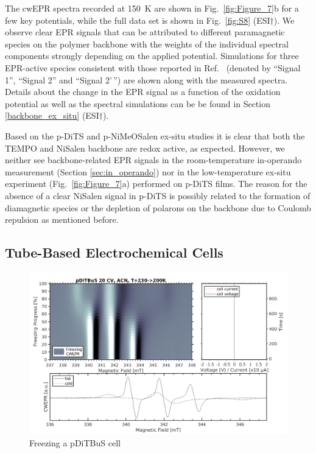The cwEPR spectra recorded at 150~K are shown in Fig.~\ref{fig:Figure_7}b for a few key potentials, while the full data set is shown in Fig.~\ref{fig:S8} (ESI$\dag$). We observe clear EPR signals that can be attributed to different paramagnetic species on the polymer backbone with the weights of the individual spectral components strongly depending on the applied potential. Simulations for three EPR-active species consistent with those reported in Ref.~\cite{Dmitrieva2018} (denoted by ``Signal 1'', ``Signal 2'' and ``Signal 2'\,'') are shown along with the measured spectra. Details about the change in the EPR signal as a function of the oxidation potential as well as the spectral simulations can be be found in Section \ref{backbone_ex_situ} (ESI$\dag$).

%
\par

Based on the p-DiTS and p-NiMeOSalen ex-situ studies it is clear that both the TEMPO and NiSalen backbone are redox active, as expected. However, we neither see backbone-related EPR signals in the room-temperature in-operando measurement (Section \ref{sec:in_operando}) nor in the low-temperature ex-situ experiment (Fig.~\ref{fig:Figure_7}a) performed on p-DiTS films. The reason for the absence of a clear NiSalen signal in p-DiTS is possibly related to the formation of diamagnetic species or the depletion of polarons on the backbone due to Coulomb repulsion as mentioned before.


\subsection{Tube-Based Electrochemical Cells}

\begin{figure}[h]
\center
	\includegraphics[width=1\textwidth]{./operando_epr/figures/CRYO/SANDWICH_FREEZING.pdf}
	\caption{Freezing a pDiTBuS cell}
	\label{fig:operando_cold_battery}
\end{figure}


